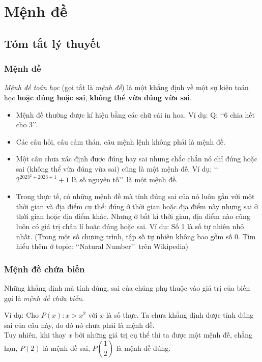 \section{Mệnh đề}
\subsection{Tóm tắt lý thuyết}
\begin{tomtat}
\subsubsection{Mệnh đề}
\begin{boxdn}{}
	\textit{Mệnh đề toán học} (gọi tắt là \textit{mệnh đề}) là một khẳng định về một sự kiện toán học \textbf{hoặc đúng hoặc sai}, \textbf{không thể vừa đúng vừa sai}.	
	\begin{itemize}
		\item Mệnh đề thường được kí hiệu bằng các chữ cái in hoa. Ví dụ: Q: \lq\lq  6 chia hết cho 3\rq\rq.
	\end{itemize}
\end{boxdn}

\begin{note}
	\begin{itemize}
		\item Các câu hỏi, câu cảm thán, câu mệnh lệnh không phải là mệnh đề.
		\item Một câu chưa xác định được đúng hay sai nhưng chắc chắn nó chỉ đúng hoặc sai (không thể vừa đúng vừa sai) cũng là một mệnh đề. Ví dụ: \lq\lq  $2^{2023^2+2023+1}+1$ là số nguyên tố\rq\rq\ là một mệnh đề.
		\item Trong thực tế, có những mệnh đề mà tính đúng sai của nó luôn gắn với một thời gian và địa điểm cụ thể: đúng ở thời gian hoặc địa điểm này nhưng sai ở thời gian hoặc địa điểm khác. Nhưng ở bất kì thời gian, địa điểm nào cũng luôn có giá trị chân lí hoặc đúng hoặc sai. Ví dụ: Số 1 là số tự nhiên nhỏ nhất. (Trong một số chương trình, tập số tự nhiên không bao gồm số 0. Tìm hiểu thêm ở topic: \lq\lq  Natural Number\rq\rq\ trên Wikipedia) 
	\end{itemize}
\end{note}
\subsubsection{Mệnh đề chứa biến}
\begin{boxdn}{}
	Những khẳng định mà tính đúng, sai của chúng phụ thuộc vào giá trị của biến gọi là \textit{mệnh đề chứa biến}.
\end{boxdn}
Ví dụ: Cho $P(x): x>x^2$ với $x$ là số thực. Ta chưa khẳng định được tính đúng sai của câu này, do đó nó chưa phải là mệnh đề.\\
Tuy nhiên, khi thay $x$ bởi những giá trị cụ thể thì ta được một mệnh đề, chẳng hạn, $P(2)$ là mệnh đề sai, $P\left(\dfrac{1}{2}\right)$ là mệnh đề đúng.


\end{tomtat}
